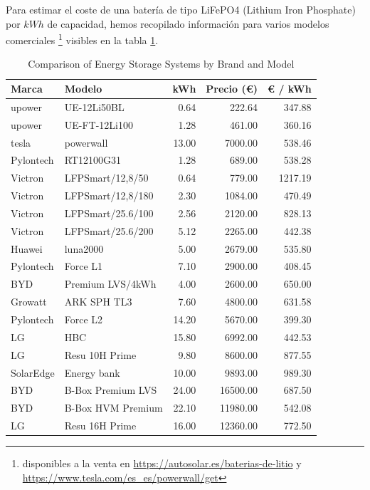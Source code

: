 Para estimar el coste de una batería de tipo LiFePO4 (Lithium Iron Phosphate)
por $kWh$ de capacidad, hemos recopilado información para varios modelos
comerciales \footnote{disponibles a la venta en
\url{https://autosolar.es/baterias-de-litio} y
\url{https://www.tesla.com/es_es/powerwall/get}} visibles en la tabla
\ref{tab:batteries_data}.

\begin{table}[htbp]
	\centering
	\begin{tabular}{llrrr}
		\toprule
		Marca     & Modelo            & kWh   & Precio (€) & € / kWh \\
		\midrule
		upower    & UE-12Li50BL       & 0.64  & 222.64     & 347.88  \\
		upower    & UE-FT-12Li100     & 1.28  & 461.00     & 360.16  \\
		tesla     & powerwall         & 13.00 & 7000.00    & 538.46  \\
		Pylontech & RT12100G31        & 1.28  & 689.00     & 538.28  \\
		Victron   & LFPSmart/12,8/50  & 0.64  & 779.00     & 1217.19 \\
		Victron   & LFPSmart/12,8/180 & 2.30  & 1084.00    & 470.49  \\
		Victron   & LFPSmart/25.6/100 & 2.56  & 2120.00    & 828.13  \\
		Victron   & LFPSmart/25.6/200 & 5.12  & 2265.00    & 442.38  \\
		Huawei    & luna2000          & 5.00  & 2679.00    & 535.80  \\
		Pylontech & Force L1          & 7.10  & 2900.00    & 408.45  \\
		BYD       & Premium LVS/4kWh  & 4.00  & 2600.00    & 650.00  \\
		Growatt   & ARK SPH TL3       & 7.60  & 4800.00    & 631.58  \\
		Pylontech & Force L2          & 14.20 & 5670.00    & 399.30  \\
		LG        & HBC               & 15.80 & 6992.00    & 442.53  \\
		LG        & Resu 10H Prime    & 9.80  & 8600.00    & 877.55  \\
		SolarEdge & Energy bank       & 10.00 & 9893.00    & 989.30  \\
		BYD       & B-Box Premium LVS & 24.00 & 16500.00   & 687.50  \\
		BYD       & B-Box HVM Premium & 22.10 & 11980.00   & 542.08  \\
		LG        & Resu 16H Prime    & 16.00 & 12360.00   & 772.50  \\
		\bottomrule
	\end{tabular}
	\caption{Comparison of Energy Storage Systems by Brand and Model}
	\label{tab:batteries_data}
\end{table}

